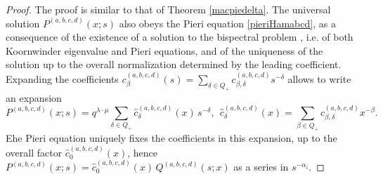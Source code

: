 \documentclass[12pt]{amsart}
\newcommand{\al}{{\alpha}}
\numberwithin{equation}{section}
\begin{document}
\begin{proof}
The proof is similar to that of Theorem \ref{macpiedelta}.
The universal solution $P^{(a,b,c,d)}(x;s)$ also obeys 
%
the Pieri equation \eqref{pieriHamabcd}, as a consequence of the existence of a solution to the bispectral problem \cite{Cherednik95,vDselfdual,Sahi,Chalykh},
i.e. of both Koornwinder eigenvalue and Pieri equations, and of the uniqueness of the solution up to the overall normalization determined by the leading coefficient. Expanding the coefficients 
$c_\beta^{(a,b,c,d)}(s)=\sum_{\delta\in Q_+} c_{\beta,\delta}^{(a,b,c,d)} s^{-\delta}$
allows to write an expansion
$$P^{(a,b,c,d)}(x;s)=q^{\lambda\cdot \mu} \sum_{\delta\in Q_+} \hat c_\delta^{(a,b,c,d)}(x)\, s^{-\delta}, \ \ 
\hat c_\delta^{(a,b,c,d)}(x)=\sum_{\beta\in Q_+} c_{\beta,\delta}^{(a,b,c,d)}x^{-\beta} .$$
Ehe Pieri equation uniquely fixes the coefficients in this expansion, up to the overall factor $\hat c_0^{(a,b,c,d)}(x)$,  hence $P^{(a,b,c,d)}(x;s)=\hat c_0^{(a,b,c,d)}(x)\, Q^{(a,b,c,d)}(s;x)$ as a series in $s^{-\al_i}$. 


\end{proof}
\end{document}
